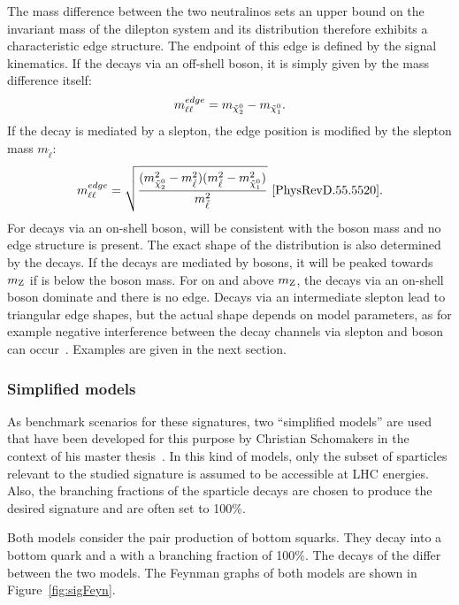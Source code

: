 The mass difference between the two neutralinos sets an upper bound on the invariant mass of the dilepton system \mll and its distribution therefore exhibits a characteristic edge structure. The endpoint of this edge is defined by the signal kinematics.  If the \secondchi decays via an off-shell \Z boson, it is simply given by the mass difference itself:
\begin{equation}
m_{\ell\ell}^{edge} = m_{{\tilde{\chi}^0_2}} - m_{{\tilde{\chi}^0_1}}.
\end{equation}
If the decay is mediated by a slepton, the edge position is modified by the slepton mass $m_{\tilde{\ell}}$:
\begin{equation}
m_{\ell\ell}^{edge} = \sqrt{\frac{(m_{{\tilde{\chi}^0_2}}^2-m_{\tilde{\ell}}^2)(m_{\tilde{\ell}}^2-m_{{\tilde{\chi}^0_1}}^2)}{m_{\tilde{\ell}}^2}}~\cite{PhysRevD.55.5520}. 
\end{equation}
For decays via an on-shell \Z boson, \mll will be consistent with the \Z boson mass and no edge structure is present. The exact shape of the distribution is also determined by the decays. If the decays are mediated by \Z bosons, it will be peaked towards $m_{\mathrm{Z}}$ if \mlledge is below the \Z boson mass. For \mlledge on and above $m_{\mathrm{Z}}$, the decays via an on-shell \Z boson dominate and there is no edge. Decays via an intermediate slepton lead to triangular edge shapes, but the actual shape depends on model parameters, as for example negative interference between the decay channels via slepton and \Z boson can occur~\cite{Nojiri:1999ki}. Examples are given in the next section.
\subsubsection{Simplified models}
\label{sec:models}
As benchmark scenarios for these signatures, two ``simplified models'' are used that have been developed for this purpose by Christian Schomakers in the context of his master thesis~\cite{Schomakers:2014zza}. In this kind of models, only the subset of sparticles relevant to the studied signature is assumed to be accessible at LHC energies. Also, the branching fractions of the sparticle decays are chosen to produce the desired signature and are often set to 100\%.  

Both models consider the pair production of bottom squarks. They decay into a bottom quark and a \secondchi with a branching fraction of 100\%. The decays of the \secondchi differ between the two models. The Feynman graphs of both models are shown in Figure~\ref{fig:sigFeyn}.

